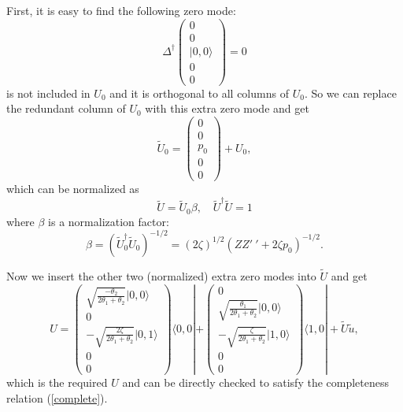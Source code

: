 \documentclass[a4paper,a4paper]{article}
\begin{document}
First, it is easy to find the following zero mode:
\begin{equation}
\Delta^\dag\left(\begin{array}{c} 0 \\ 0 \\ |0,0\rangle \\ 0 \\
0 \end{array}\right)=0
\end{equation}
is not included in $U_0$ and it is orthogonal to all columns of
$U_0$. So we can replace the redundant column of $U_0$ with this
extra zero mode and get
\begin{equation}
\tilde U_0=\left(\begin{array}{c} 0 \\ 0 \\ p_0 \\ 0 \\ 0
\end{array}\right)+U_0,
\end{equation}
which can be normalized as
\begin{equation}
\tilde{U}=\tilde U_0\beta,\quad\tilde{U}^\dag\tilde{U}=1
\end{equation}
where $\beta$ is a normalization factor:
\begin{equation}
\beta=(\tilde U_0^\dag\tilde U_0)^{-1/2}=(2\zeta)^{1/2}
(ZZ'~'+2\zeta p_0)^{-1/2}.
\end{equation}

Now we insert the other two (normalized) extra zero modes into
$\tilde{U}$ and get
\begin{equation}
U=\left(\begin{array}{c} \sqrt{\frac{-\theta_2}{2\theta_1+
\theta_2}}|0,0\rangle \\ 0 \\ -\sqrt{\frac{2\zeta}{2\theta_1+
\theta_2}}|0,1\rangle \\ 0 \\ 0 \end{array}\right)\langle 0,0|
+\left(\begin{array}{c} 0 \\ \sqrt{\frac{\theta_1}{2\theta_1+
\theta_2}}|0,0\rangle \\ -\sqrt{\frac{\zeta}{2\theta_1+\theta_2}}
|1,0\rangle \\ 0 \\ 0 \end{array}\right)\langle 1,0|
+\tilde{U}\tilde{u},
\end{equation}
which is the required $U$ and can be directly checked to satisfy
the completeness relation (\ref{complete}).
\end{document}

